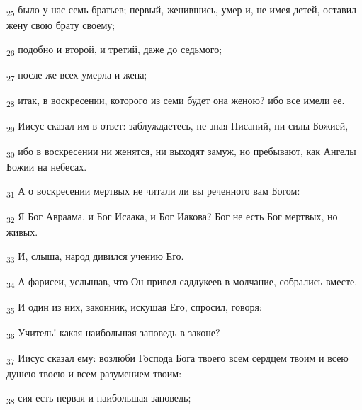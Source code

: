 \begin{tcolorbox}
\textsubscript{25} было у нас семь братьев; первый, женившись, умер и, не имея детей, оставил жену свою брату своему;
\end{tcolorbox}
\begin{tcolorbox}
\textsubscript{26} подобно и второй, и третий, даже до седьмого;
\end{tcolorbox}
\begin{tcolorbox}
\textsubscript{27} после же всех умерла и жена;
\end{tcolorbox}
\begin{tcolorbox}
\textsubscript{28} итак, в воскресении, которого из семи будет она женою? ибо все имели ее.
\end{tcolorbox}
\begin{tcolorbox}
\textsubscript{29} Иисус сказал им в ответ: заблуждаетесь, не зная Писаний, ни силы Божией,
\end{tcolorbox}
\begin{tcolorbox}
\textsubscript{30} ибо в воскресении ни женятся, ни выходят замуж, но пребывают, как Ангелы Божии на небесах.
\end{tcolorbox}
\begin{tcolorbox}
\textsubscript{31} А о воскресении мертвых не читали ли вы реченного вам Богом:
\end{tcolorbox}
\begin{tcolorbox}
\textsubscript{32} Я Бог Авраама, и Бог Исаака, и Бог Иакова? Бог не есть Бог мертвых, но живых.
\end{tcolorbox}
\begin{tcolorbox}
\textsubscript{33} И, слыша, народ дивился учению Его.
\end{tcolorbox}
\begin{tcolorbox}
\textsubscript{34} А фарисеи, услышав, что Он привел саддукеев в молчание, собрались вместе.
\end{tcolorbox}
\begin{tcolorbox}
\textsubscript{35} И один из них, законник, искушая Его, спросил, говоря:
\end{tcolorbox}
\begin{tcolorbox}
\textsubscript{36} Учитель! какая наибольшая заповедь в законе?
\end{tcolorbox}
\begin{tcolorbox}
\textsubscript{37} Иисус сказал ему: возлюби Господа Бога твоего всем сердцем твоим и всею душею твоею и всем разумением твоим:
\end{tcolorbox}
\begin{tcolorbox}
\textsubscript{38} сия есть первая и наибольшая заповедь;
\end{tcolorbox}
